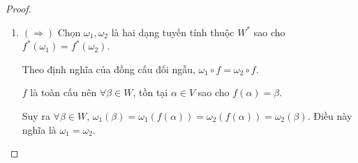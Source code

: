 \begin{proof}
\begin{enumerate}[label = (\arabic*)]
              tức là $\omega\circ f = \nu$.
              
              Mà $f^{*}(\omega) = \omega\circ f$ nên $f^{*}(\omega) = \nu$.
              
              Ta đã có được dạng tuyến tính $\omega\in W^{*}$ như mong muốn.
              
              Do đó, $f^{*}$ là một toàn cấu.
              
              \bigskip
              
              ($\Leftarrow$) Để chứng minh $f$ là đơn cấu, ta sẽ chỉ ra $\ker f = \{0\}$.
              
              Chọn $\nu$ là một dạng tuyến tính trên $V$ và là một đơn cấu.
              
              $\alpha$ là một vector \textit{bất kỳ} thuộc $\ker f$.
              
              Do $f^{*}: {W}^{*} \to {V}^{*}$ là một toàn cấu nên tồn tại một dạng tuyến tính $\omega \in {W}^{*}$ sao cho ${f}^{*}: \omega \mapsto \nu$.
              
              Theo định nghĩa của đồng cấu đối ngẫu
              \begin{align*}
                                   & {f}^{*}(\omega) = \omega\circ f  \\
                  \implies\quad & \nu = \omega\circ f              \\
                  \implies\quad & \nu (\alpha) = \omega(f(\alpha)) \\
                  \implies\quad & \nu (\alpha) = 0.
              \end{align*}
              
              Theo lựa chọn ban đầu, $\nu$ là một đơn cấu. Do đó $\alpha = 0$.
              
              Điều này chứng tỏ $f$ là một đơn cấu.
        \item $(\Rightarrow)$ Chọn $\omega_{1}, \omega_{2}$ là hai dạng tuyến tính thuộc ${W}^{*}$ sao cho ${f}^{*}(\omega_{1}) = {f}^{*}(\omega_{2})$.
              
              Theo định nghĩa của đồng cấu đối ngẫu, $\omega_{1}\circ f = \omega_{2}\circ f$.
              
              $f$ là toàn cấu nên $\forall\beta\in W$, tồn tại $\alpha\in V$ sao cho $f(\alpha) = \beta$.
              
              Suy ra $\forall\beta\in W$, $\omega_{1}(\beta) = \omega_{1}(f(\alpha)) = \omega_{2}(f(\alpha)) = \omega_{2}(\beta)$. Điều này nghĩa là $\omega_{1} = \omega_{2}$.
              

\end{enumerate}
\end{proof}
